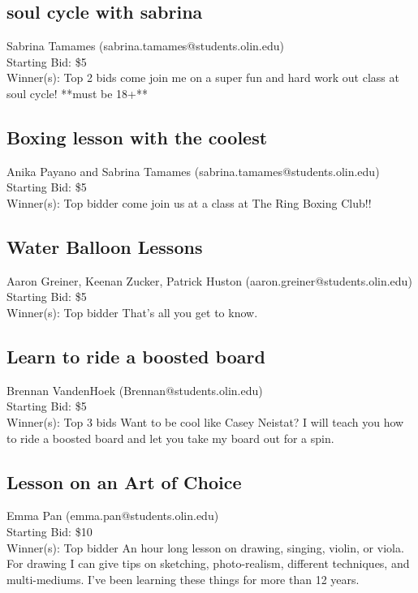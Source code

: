 \documentclass[11pt]{article}
\begin{document}
\subsection{soul cycle with sabrina }
Sabrina Tamames (sabrina.tamames@students.olin.edu) \\
Starting Bid: \$5 \\
Winner(s): 
Top 2 bids\newline
come join me on a super fun and hard work out class at soul cycle! **must be 18+**
\subsection{Boxing lesson with the coolest }
Anika Payano and Sabrina Tamames (sabrina.tamames@students.olin.edu) \\
Starting Bid: \$5 \\
Winner(s): 
Top bidder\newline
come join us at a class at The Ring Boxing Club!!
\subsection{Water Balloon Lessons}
Aaron Greiner, Keenan Zucker, Patrick Huston (aaron.greiner@students.olin.edu) \\
Starting Bid: \$5 \\
Winner(s): 
Top bidder\newline
That's all you get to know.
\subsection{Learn to ride a boosted board}
Brennan VandenHoek  (Brennan@students.olin.edu) \\
Starting Bid: \$5 \\
Winner(s): 
Top 3 bids\newline
Want to be cool like Casey Neistat? I will teach you how to ride a boosted board and let you take my board out for a spin.
\subsection{Lesson on an Art of Choice}
Emma Pan (emma.pan@students.olin.edu) \\
Starting Bid: \$10 \\
Winner(s): 
Top bidder\newline
An hour long lesson on drawing, singing, violin, or viola. For drawing I can give tips on sketching, photo-realism, different techniques, and multi-mediums. I've been learning these things for more than 12 years.
\end{document}
